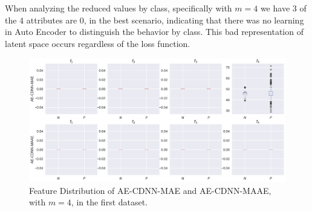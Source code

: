 \begin{table}[!ht]
\centering
{}
\caption{Accuracy in Classification, with loss MAAE, on each fold cross-validation, for Dataset 2.}
\label{table:acc-maae-chbmit-fold-2}
\end{table}

When analyzing the reduced values by class, specifically with $m = 4$ we have $3$ of the $4$ attributes are $0$, in the best scenario, indicating that there was no learning in Auto Encoder to distinguish the behavior by class. This bad representation of latent space occurs regardless of the loss function.


\begin{figure}[!ht]
\centering
\includegraphics[width=0.8\linewidth]{figure/feature_distribution_4.pdf}
  \caption{Feature Distribution of AE-CDNN-MAE and AE-CDNN-MAAE, with $m=4$, in the first dataset. }
\label{fig:feature_distribution_4}
\end{figure}

